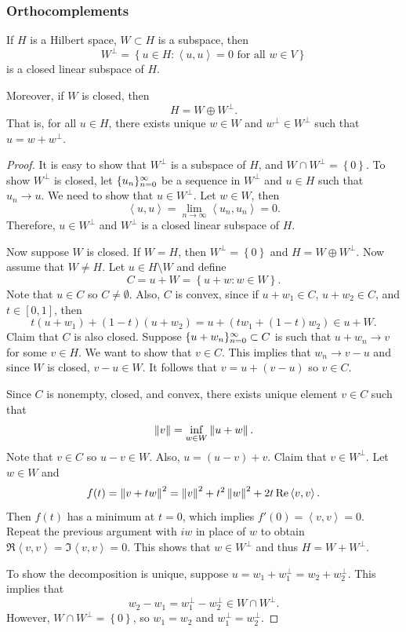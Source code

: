 \documentclass[a4paper]{article}
\renewcommand{\braket}[2]{\left\langle #1, #1 \right\rangle}
\begin{document}
\subsubsection*{Orthocomplements}
\begin{thm}
If $H$ is a Hilbert space, $W \subset H$ is a subspace,
then 
\[
W^\perp = \left\{ u \in H : \braket{u}{w} = 0 
\text{ for all } w \in V \right\}
\]
is a closed linear subspace of $H$. 

Moreover, if $W$ is closed, then 
\[
H = W \oplus W^\perp.
\]
That is, for all $u \in H$, there exists
unique $w \in W$ and $w^\perp \in W^\perp$ such that 
$u = w + w^\perp$.
\end{thm}

\begin{proof}
It is easy to show that $W^\perp$ is a subspace of $H$,
and $W \cap W^\perp = \left\{ 0 \right\}$. 
To show $W^\perp$ is closed, let $\{ u_n \}_{n=0}^\infty$
be a sequence in $W^\perp$ and $u \in H$ such that 
$u_n \to u$. We need to show that $u \in W^\perp$. 
Let $w \in W$, then 
\[
\braket{u}{w} = \lim_{n \to \infty} \braket{u_n}{w} 
= 0.
\]
Therefore, $u \in W^\perp$ and $W^\perp$ is a closed 
linear subspace of $H$.

Now suppose $W$ is closed. If $W = H$, then 
$W^\perp = \left\{ 0 \right\}$ and $H = W \oplus W^\perp$. 
Now assume that $W \neq H$. Let $u \in H \setminus W$
and define
\[
C = u + W = \left\{ u + w : w \in W \right\}.
\]
Note that $u \in C$ so $C \neq \emptyset$. Also, 
$C$ is convex, since if $u + w_1 \in C$,
$u + w_2 \in C$, and $t \in [0, 1]$, then 
\[
t(u + w_1) + (1 - t)(u + w_2) = 
u + (t w_1 + (1-t) w_2) \in u + W.
\]
Claim that $C$ is also closed. Suppose $\{ u + w_n \}_{n=0}^\infty
\subset C$ is such that $u + w_n \to v$ for some 
$v \in H$. We want to show that $v \in C$. This implies that 
$w_n \to v - u$ and since $W$ is closed, $v - u \in W$. 
It follows that $v = u + (v - u)$ so $v \in C$. 

Since $C$ is nonempty, closed, and convex, there exists 
unique element $v \in C$ such that 
\[
  \left\lVert v\right\rVert = \inf_{w \in W} \left\lVert u + w\right\rVert.
\]
Note that $v \in C$ so $u - v \in W$. Also, 
$u = (u - v) + v$. Claim that $v \in W^\perp$.
Let $w \in W$ and 
\[
  f(t) = \norm{v + t w}^2 = 
  \norm{v}^2 + t^2 \norm{w}^2 + 2 t \Re \braket{v}{w}.
\]
Then $f(t)$ has a minimum at $t = 0$, which implies 
$f'(0) = \braket{v}{w} = 0$. Repeat the previous 
argument with $iw$ in place of $w$ to obtain 
$\Re \braket{v}{iw} = \Im \braket{v}{w} = 0$. 
This shows that $w \in W^\perp$ and thus
$H = W + W^\perp$.

To show the decomposition is unique, suppose 
$u = w_1 + w_1^\perp = w_2 + w_2^\perp$. This implies 
that 
\[
  w_2 - w_1 = w_1^\perp - w_2^\perp \in W \cap W^\perp.
\]
However, $W \cap W^\perp = \left\{ 0 \right\}$, so 
$w_1 = w_2$ and $w_1^\perp = w_2^\perp$.
\end{proof}
\end{document}
